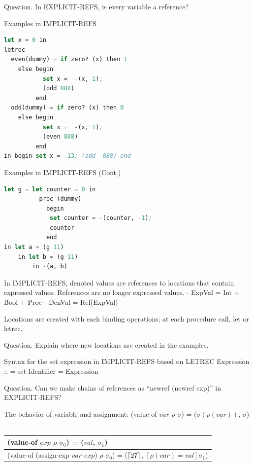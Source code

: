 \documentclass{article}
\begin{document}
\begin{huge}
Question. In EXPLICIT-REFS, is every variable a reference?


\blob Examples in IMPLICIT-REFS

\begin{lstlisting}[language=Lisp]
let x = 0 in  
letrec 
  even(dummy) = if zero? (x) then 1
    else begin
           set x =  -(x, 1);
           (odd 888)
         end
  odd(dummy) = if zero? (x) then 0
    else begin 
           set x =  -(x, 1);
           (even 888)
         end
in begin set x =  13; (odd -888) end
\end{lstlisting}


\blob Examples in IMPLICIT-REFS (Cont.)

\begin{lstlisting}[language=Lisp]
let g = let counter = 0 in  
          proc (dummy) 
            begin
             set counter = -(counter, -1);
             counter
            end
in let a = (g 11)
    in let b = (g 11)
        in -(a, b)
\end{lstlisting}


In IMPLICIT-REFS, denoted values are references to locations that contain expressed values. References are no longer expressed values. \al
- ExpVal = Int + Bool + Proc  \al
- DenVal = Ref(ExpVal)

Locations are created with each binding operations; at each procedure call, let or letrec.

Question. Explain where new locations are created in the examples.

Syntax for the set expression in IMPLICIT-REFS based on LETREC \al
\al
Expression :: = set Identifier = Expression 

Question. Can we make chains of references as ``newref (newref exp)''  in EXPLICIT-REFS?


The behavior of variable and assignment: \al
(value-of $var$ $\rho$ $\sigma$) = ($\sigma(\rho(var))$, $\sigma$)  \al
\ \al
\begin{tabular}{l}
(value-of $exp$ $\rho$ $\sigma_0$) = ($val$, $\sigma_1$)  \\ \hline
(value-of (assign-exp $var$ $exp$) $\rho$ $\sigma_0$) = ($\lceil 27 \rceil$, $[\rho(var)=val]\sigma_1$) \\
\end{tabular}
\al


\end{huge}
\end{document}
